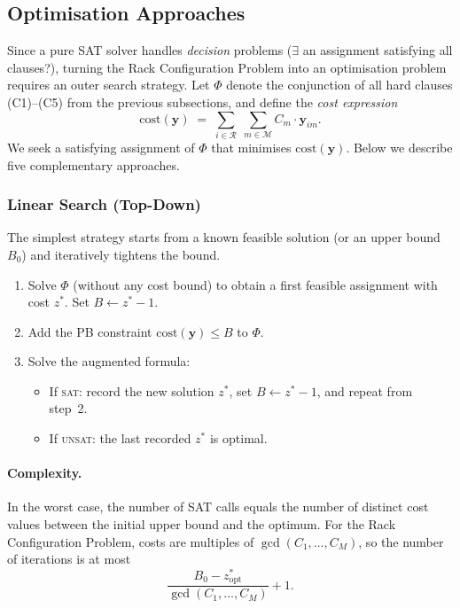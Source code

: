 \documentclass[11pt,a4paper]{article}
\newcommand{\setR}{\mathcal{R}}
\newcommand{\setM}{\mathcal{M}}
\begin{document}
\subsection{Optimisation Approaches}
\label{sec:sat-opt}

Since a pure SAT solver handles \emph{decision} problems
($\exists$ an assignment satisfying all clauses?),
turning the Rack Configuration Problem into an optimisation problem
requires an outer search strategy.
Let $\Phi$ denote the conjunction of all hard clauses
(C1)--(C5) from the previous subsections, and define the
\emph{cost expression}
\begin{equation}\label{eq:cost-expr}
  \mathrm{cost}(\mathbf{y})
  \;=\;
  \sum_{i \in \setR}\;\sum_{m \in \setM} C_m \cdot \mathbf{y}_{im}.
\end{equation}
We seek a satisfying assignment of $\Phi$ that minimises
$\mathrm{cost}(\mathbf{y})$.
Below we describe five complementary approaches.

\subsubsection{Linear Search (Top-Down)}
\label{sec:opt-linear}

The simplest strategy starts from a known feasible solution
(or an upper bound $B_0$) and iteratively tightens the bound.

\begin{enumerate}
  \item Solve $\Phi$ (without any cost bound) to obtain a first
        feasible assignment with cost $z^{*}$.
        Set $B \leftarrow z^{*} - 1$.
  \item Add the PB constraint
        $\mathrm{cost}(\mathbf{y}) \le B$ to $\Phi$.
  \item Solve the augmented formula:
    \begin{itemize}
      \item If \textsc{sat}: record the new solution $z^{*}$,
            set $B \leftarrow z^{*} - 1$, and repeat from step~2.
      \item If \textsc{unsat}: the last recorded $z^{*}$ is optimal.
    \end{itemize}
\end{enumerate}

\paragraph{Complexity.}
In the worst case, the number of SAT calls equals the number of
distinct cost values between the initial upper bound and the optimum.
For the Rack Configuration Problem, costs are multiples of
$\gcd(C_1,\dots,C_M)$, so the number of iterations is at most
\[
  \frac{B_0 - z^{*}_{\mathrm{opt}}}{\gcd(C_1,\dots,C_M)} + 1.
\]
\end{document}
